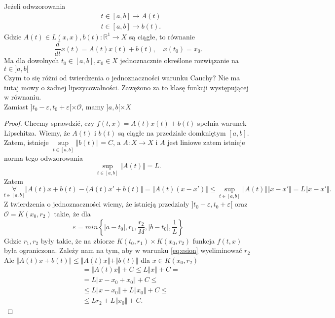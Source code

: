 \documentclass[../main.tex]{subfiles}
\begin{document}
\pagebreak
\begin{tw}
    Jeżeli odwzorowania
        \begin{align*}
            &t\in [a,b]\to A(t)\\
            &t\in [a,b]\to b(t)
        .\end{align*}
        Gdzie $A(t)\in L(x,x), b(t) : \mathbb{R}^1\to X$ są ciągłe, to równanie
        \[
            \frac{d}{dt}x(t) = A(t)x(t) + b(t),\quad x(t_0) = x_0
        .\]
        Ma dla dowolnych $t_0\in[a,b], x_0\in X$ jednoznacznie określone rozwiązanie na $t\in]a,b[$\\
        Czym to się różni od twierdzenia o jednoznaczności warunku Cauchy? Nie ma tutaj mowy o żadnej lipszycowalności. Zawężono za to klasę funkcji występującej w równaniu.\\
        Zamiast $]t_0-\varepsilon,t_0+\varepsilon[\times \mathcal{O}$, mamy $]a,b[ \times X$
\end{tw}
\begin{proof}
    Chcemy sprawdzić, czy $f(t,x) = A(t) x(t)+b(t)$ spełnia warunek Lipschitza. Wiemy, że  $A(t)$ i $b(t)$ są ciągłe na przedziale domkniętym $[a,b]$.
    Zatem, istnieje $\underset{t\in[a,b]}{\sup} \Vert b(t) \Vert = C$, a $A: X\to X$ i $A$ jest liniowe zatem istnieje norma tego odwzorowania
    \[
        \underset{t\in[a,b]}{\sup} \Vert A(t) \Vert = L
    .\]
    Zatem
    \[
        \underset{t\in[a,b]}{\forall} \Vert A(t)x + b(t) - (A(t) x' + b(t) \Vert = \Vert A(t)(x-x') \Vert \le \underset{t\in[a,b]}{\sup} \Vert A(t) \Vert \Vert x-x' \Vert = L \Vert x-x' \Vert
    .\]
    Z twierdzenia o jednoznaczności wiemy, że istnieją przedziały
    $]t_0-\varepsilon,t_0+\varepsilon[$ oraz $\mathcal{O} = K(x_0,r_2)$ takie, że dla
    \begin{equation}\label{eq:esion}
        \varepsilon = min\left\{|a-t_0|,r_1,\frac{r_2}{M},|b-t_0|,\frac{1}{L} \right\}
    \end{equation}
    Gdzie $r_1,r_2$ były takie, że na zbiorze $K(t_0,r_1)\times K(x_0,r_2)$ funkcja $f(t,x)$ była ograniczona.
    Zależy nam na tym, aby w warunku \ref{eq:esion} wyeliminować $r_2$\\
    Ale $\Vert A(t)x + b(t) \Vert \le \Vert A(t)x\Vert + \Vert b(t) \Vert$ dla $x\in K(x_0,r_2)$
    \begin{align*}
        &= \Vert A(t)x \Vert + C \le L\Vert x \Vert + C = \\
        &= L\Vert x-x_0+x_0 \Vert +C \le\\
        &\le L \Vert x-x_0 \Vert + L \Vert x_0 \Vert  + C\le\\
        &\le L r_2 + L \Vert x_0 \Vert +C
    .\end{align*}




\end{proof}
\end{document}
